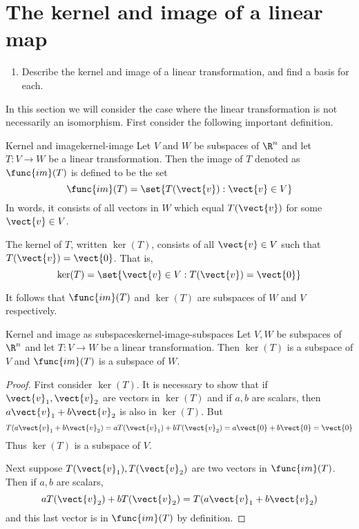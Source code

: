 \section{The kernel and image of a linear map}

\begin{outcome}
  \begin{enumerate}
  \item Describe the kernel and image of a linear transformation, and
    find a basis for each.
  \end{enumerate}
\end{outcome}

In this section we will consider the case where the linear transformation is not necessarily an
isomorphism. First consider the following important definition.

\begin{definition}{Kernel and image}{kernel-image}
Let $V$ and $W$ be subspaces of $\R^n$ and let $T:V\to W$ be a linear transformation. Then the image of $T$
denoted as $\func{im}(T) $ is defined to be the set
\begin{equation*}
\func{im}(T) = \set{T (\vect{v}):\vect{v}\in V}
\end{equation*}
In words, it consists of all vectors in $W$ which equal $T(\vect{v})$ for some $
\vect{v}\in V$.

The kernel of $T$, written $\ker (T)$, consists of all $\vect{v}\in V$ such that $T(\vect{v})=\vect{0}$. That is,
\begin{equation*}
\ker (T) =\set{\vect{v}\in V:T(\vect{v})=\vect{0}}
\end{equation*}
\end{definition}

It follows that $\func{im}(T) $ and $\ker (T) $
are subspaces of $W$ and $V$ respectively.

\begin{proposition}{Kernel and image as subspaces}{kernel-image-subspaces}
Let $V, W$ be subspaces of $\R^n$ and let $T:V\rightarrow W$ be a linear transformation. Then $\ker (
T) $ is a subspace of $V$ and $\func{im}(T) $ is a
subspace of $W$.
\end{proposition}

\begin{proof}
First consider $\ker (T)$. It is necessary to
show that if $\vect{v}_{1},\vect{v}_{2}$ are vectors in $\ker (T) $
and if $a,b$ are scalars, then $a\vect{v}_{1}+b\vect{v}_{2}$ is also in $\ker
(T)$. But
\begin{equation*}
T(a\vect{v}_{1}+b\vect{v}_{2}) =aT(\vect{v}_{1})+bT(\vect{v}_{2})=a\vect{0}+b\vect{0}=\vect{0}
\end{equation*}
Thus $\ker (T) $ is a subspace of $V$.

Next suppose $T(\vect{v}_{1}),T(\vect{v}_{2})$ are two vectors in $\func{im}(
T)$. Then if $a,b$ are scalars,
\begin{equation*}
aT(\vect{v}_{2})+bT(\vect{v}_{2})=T(a\vect{v}_{1}+b\vect{v}_{2})
\end{equation*}
and this last vector is in $\func{im}(T) $ by definition.
\end{proof}


